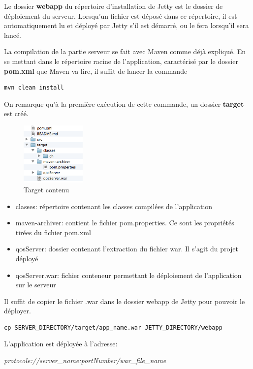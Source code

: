 Le dossier \textbf{webapp} du répertoire d'installation de Jetty est le dossier de déploiement du serveur. Lorsqu'un fichier est déposé dans ce répertoire, il est automatiquement lu et déployé par Jetty s'il est démarré, ou le fera lorsqu'il sera lancé.

\medskip

La compilation de la partie serveur se fait avec Maven comme déjà expliqué. En se mettant dans le répertoire racine de l'application, caractérisé par le dossier \textbf{pom.xml} que Maven va lire, il suffit de lancer la commande 
\begin{lstlisting}[caption=Commande Maven pour construire le fichier déployable]
mvn clean install
\end{lstlisting}

On remarque qu'à la première exécution de cette commande, un dossier \textbf{target} est créé.

\begin{figure}[H]
    \begin{center}
        \centering \includegraphics[width=120px]{00_media/target_arb}
        \caption{Target contenu}
    \end{center}
\end{figure}

\begin{itemize}
	\item classes: répertoire contenant les classes compilées de l'application
	\item maven-archiver: contient le fichier pom.properties. Ce sont les propriétés tirées du fichier pom.xml
	\item qosServer: dossier contenant l'extraction du fichier war. Il s'agit du projet déployé
	\item qosServer.war: fichier conteneur permettant le déploiement de l'application sur le serveur
\end{itemize}

\medskip

Il suffit de copier le fichier .war dans le dossier webapp de Jetty pour pouvoir le déployer.

\begin{lstlisting}[caption=Copie du fichier war vers Jetty]
	cp SERVER_DIRECTORY/target/app_name.war JETTY_DIRECTORY/webapp
\end{lstlisting}

L'application est déployée à l'adresse:

\textit{protocole://server\_name:portNumber/war\_file\_name}